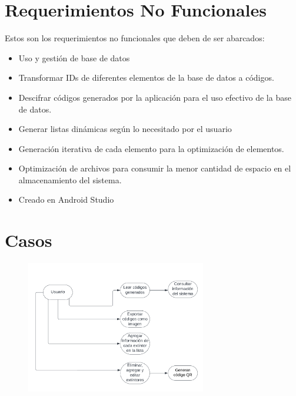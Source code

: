 \documentclass[a4paper,twoside,10pt]{report}
\begin{document}
\section{Requerimientos No Funcionales}

\par Estos son los requerimientos no funcionales que deben de ser abarcados:
\begin{itemize}
	\item Uso y gestión de base de datos 
	\item Transformar IDs de diferentes elementos de la base de datos a códigos. 
	\item Descifrar códigos generados por la aplicación para el uso efectivo de la base de datos.
	\item Generar listas dinámicas según lo necesitado por el usuario
	\item Generación iterativa de cada elemento para la optimización de elementos. 
	\item Optimización de archivos para consumir la menor cantidad de espacio en el almacenamiento del sistema. 
	\item Creado en Android Studio
\end{itemize}

\section{Casos}

\begin{figure}[htbp]
	\centering
		\includegraphics[width=0.70\textwidth]{Gaming1.png}
	\label{fig:Gaming1}
\end{figure}
\end{document}
